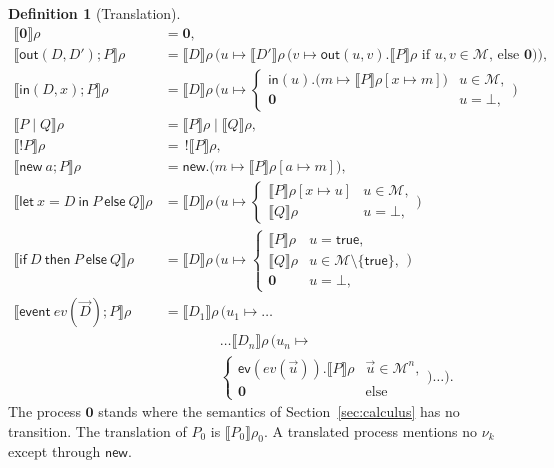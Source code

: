 \documentclass[11pt]{article}
\theoremstyle{definition}
\newtheorem{definition}{Definition}[section]
\theoremstyle{plain}
\theoremstyle{remark}
\newcommand{\sem}[1]{\llbracket #1 \rrbracket}
\begin{document}
\begin{definition}[Translation]
\begin{align*}
\sem{\mathbf{0}}\rho&=\mathbf{0},\\
\sem{\mathsf{out}(D,D');P}\rho&=\sem{D}\rho\,\Big(u\mapsto\sem{D'}\rho\,\big(v\mapsto\mathsf{out}(u,v).\sem{P}\rho\text{ if }u,v\in\mathcal{M}\text{, else }\mathbf{0}\big)\Big),\\
\sem{\mathsf{in}(D,x);P}\rho&=\sem{D}\rho\,\Big(u\mapsto\begin{cases}\mathsf{in}(u).\big(m\mapsto\sem{P}\rho[x\mapsto m]\big)&u\in\mathcal{M},\\\mathbf{0}&u=\bot,\end{cases}\Big)\\
\sem{P\mid Q}\rho&=\sem{P}\rho\mid\sem{Q}\rho,\\
\sem{!P}\rho&=\,!\sem{P}\rho,\\
\sem{\mathsf{new}\ a;P}\rho&=\mathsf{new}.\big(m\mapsto\sem{P}\rho[a\mapsto m]\big),\\
\sem{\mathsf{let}\ x=D\ \mathsf{in}\ P\ \mathsf{else}\ Q}\rho&=\sem{D}\rho\,\Big(u\mapsto\begin{cases}\sem{P}\rho[x\mapsto u]&u\in\mathcal{M},\\\sem{Q}\rho&u=\bot,\end{cases}\Big)\\
\sem{\mathsf{if}\ D\ \mathsf{then}\ P\ \mathsf{else}\ Q}\rho&=\sem{D}\rho\,\Big(u\mapsto\begin{cases}\sem{P}\rho&u=\mathsf{true},\\\sem{Q}\rho&u\in\mathcal{M}\setminus\{\mathsf{true}\},\\\mathbf{0}&u=\bot,\end{cases}\Big)\\
\sem{\mathsf{event}\ ev(\vec D);P}\rho&=\sem{D_1}\rho\,\big(u_1\mapsto\dots\\
&\qquad\qquad\dots\sem{D_n}\rho\,\big(u_n\mapsto\\
&\qquad\qquad\begin{cases}\mathsf{ev}(ev(\vec u)).\sem{P}\rho&\vec u\in\mathcal{M}^n,\\\mathbf{0}&\text{else}\end{cases}\big)\dots\big).
\end{align*}
The process $\mathbf{0}$ stands where the semantics of Section~\ref{sec:calculus} has no transition. The translation of $P_0$ is $\sem{P_0}\rho_0$. A translated process mentions no $\nu_k$ except through $\mathsf{new}$.
\end{definition}
\end{document}
